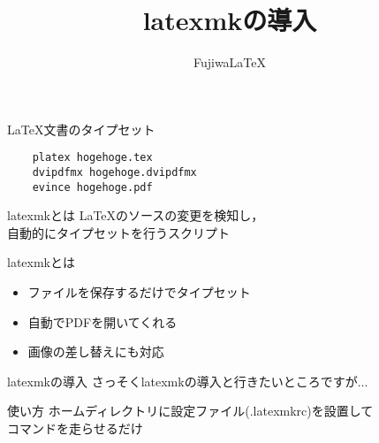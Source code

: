 \documentclass[a4j,uplatex,dvipdfmx]{beamer}
\title{latexmkの導入}
\author{FujiwaLaTeX}
\institute{室蘭工業大学工学研究科 情報電子工学系専攻}
\begin{document}
\maketitle
\begin{frame}[fragile]{\LaTeX 文書のタイプセット}
  \begin{verbatim}
    platex hogehoge.tex
    dvipdfmx hogehoge.dvipdfmx
    evince hogehoge.pdf
  \end{verbatim}
\end{frame}
\begin{frame}{latexmkとは}
  \LaTeX のソースの変更を検知し，\\
  自動的にタイプセットを行うスクリプト
\end{frame}
\begin{frame}{latexmkとは}
  \begin{itemize}
    \item ファイルを保存するだけでタイプセット
    \item 自動でPDFを開いてくれる
    \item 画像の差し替えにも対応
  \end{itemize}
\end{frame}
\begin{frame}{latexmkの導入}
  さっそくlatexmkの導入と行きたいところですが...
\end{frame}
\begin{frame}{使い方}
  ホームディレクトリに設定ファイル(.latexmkrc)を設置して\\
  コマンドを走らせるだけ
\end{frame}
\end{document}
